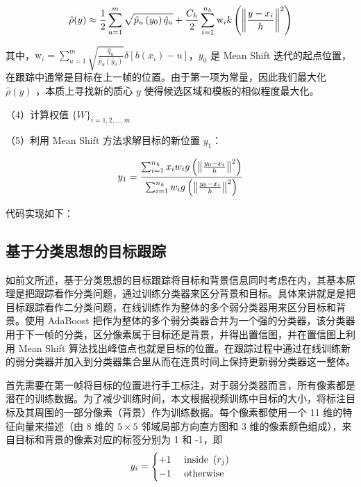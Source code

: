\begin{equation}
\hat{\rho}(y) \approx \frac{1}{2} \sum_{u=1}^m \sqrt{\hat{p}_u\left(y_0\right) \hat{q}_u}+\frac{C_h}{2} \sum_{i=1}^{n_h} \mathrm{w}_i k\left(\left\|\frac{y-x_i}{h}\right\|^2\right)
\vspace{0.5cm}
\end{equation}

其中，$\mathrm{w}_i=\sum_{u=1}^m \sqrt{\frac{\hat{q}_u}{\hat{p}_u\left(\hat{y}_0\right)}} \delta\left[b\left(x_i\right)-u\right]$，$y_0$ 是 Mean Shift 迭代的起点位置， 在跟踪中通常是目标在上一帧的位置。由于第一项为常量，因此我们最大化 $\hat{\rho}(y)$ ，本质上寻找新的质心 $y$ 使得候选区域和模板的相似程度最大化。

（4）计算权值 $\{W\}_{i=1,2, \ldots, m}$

（5）利用 Mean Shift 方法求解目标的新位置 $y_1$： 
\vspace{0.5cm}

\begin{equation}
y_1=\frac{\sum_{i=1}^{n_h} x_i w_i g\left(\left\|\frac{y_0-x_i}{h}\right\|^2\right)}{\sum_{i=1}^{n_h} w_i g\left(\left\|\frac{y_0-x_i}{h}\right\|^2\right)}
\vspace{0.5cm}
\end{equation}


代码实现如下：

\vspace{0.3cm}


\subsection{基于分类思想的目标跟踪}

如前文所述，基于分类思想的目标跟踪将目标和背景信息同时考虑在内，其基本原理是把跟踪看作分类问题，通过训练分类器来区分背景和目标。具体来讲就是是把目标跟踪看作二分类问题，在线训练作为整体的多个弱分类器用来区分目标和背景。使用 AdaBoost 把作为整体的多个弱分类器合并为一个强的分类器，该分类器用于下一帧的分类，区分像素属于目标还是背景，并得出置信图，并在置信图上利用 Mean Shift 算法找出峰值点也就是目标的位置。在跟踪过程中通过在线训练新的弱分类器并加入到分类器集合里从而在连贯时间上保持更新弱分类器这一整体。

首先需要在第一帧将目标的位置进行手工标注，对于弱分类器而言，所有像素都是潜在的训练数据。为了减少训练时间，本文根据视频训练中目标的大小，将标注目标及其周围的一部分像素（背景）作为训练数据。每个像素都使用一个 11 维的特征向量来描述（由 8 维的 $5\times 5$ 邻域局部方向直方图和 3 维的像素颜色组成），来自目标和背景的像素对应的标签分别为 1 和 -1，即
\vspace{0.3cm}
\begin{equation}
y_i= \begin{cases}+1 & \text { inside }\left(r_j\right) \\ -1 & \text { otherwise }\end{cases}
\vspace{0.3cm}
\end{equation}

